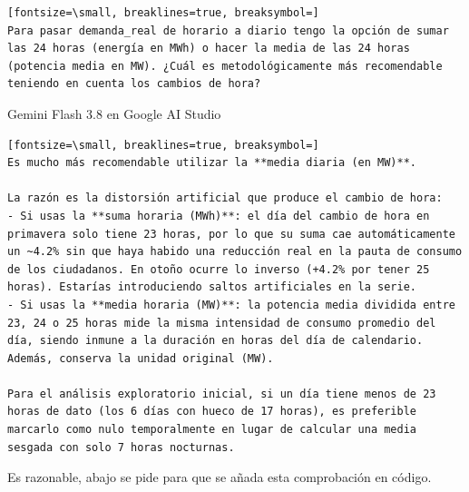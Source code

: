 \documentclass[12pt,a4paper,oneside]{book}
\begin{document}
\begin{iaprompt}
\begin{Verbatim}[fontsize=\small, breaklines=true, breaksymbol=]
Para pasar demanda_real de horario a diario tengo la opción de sumar las 24 horas (energía en MWh) o hacer la media de las 24 horas (potencia media en MW). ¿Cuál es metodológicamente más recomendable teniendo en cuenta los cambios de hora?
\end{Verbatim}
\end{iaprompt}
\begin{iaresp}{Gemini Flash 3.8 en Google AI Studio}
\begin{Verbatim}[fontsize=\small, breaklines=true, breaksymbol=]
Es mucho más recomendable utilizar la **media diaria (en MW)**.

La razón es la distorsión artificial que produce el cambio de hora:
- Si usas la **suma horaria (MWh)**: el día del cambio de hora en primavera solo tiene 23 horas, por lo que su suma cae automáticamente un ~4.2% sin que haya habido una reducción real en la pauta de consumo de los ciudadanos. En otoño ocurre lo inverso (+4.2% por tener 25 horas). Estarías introduciendo saltos artificiales en la serie.
- Si usas la **media horaria (MW)**: la potencia media dividida entre 23, 24 o 25 horas mide la misma intensidad de consumo promedio del día, siendo inmune a la duración en horas del día de calendario. Además, conserva la unidad original (MW).

Para el análisis exploratorio inicial, si un día tiene menos de 23 horas de dato (los 6 días con hueco de 17 horas), es preferible marcarlo como nulo temporalmente en lugar de calcular una media sesgada con solo 7 horas nocturnas.
\end{Verbatim}
\end{iaresp}
\begin{iaanalisis}
Es razonable, abajo se pide para que se añada esta comprobación en código.
\end{iaanalisis}
\end{document}
